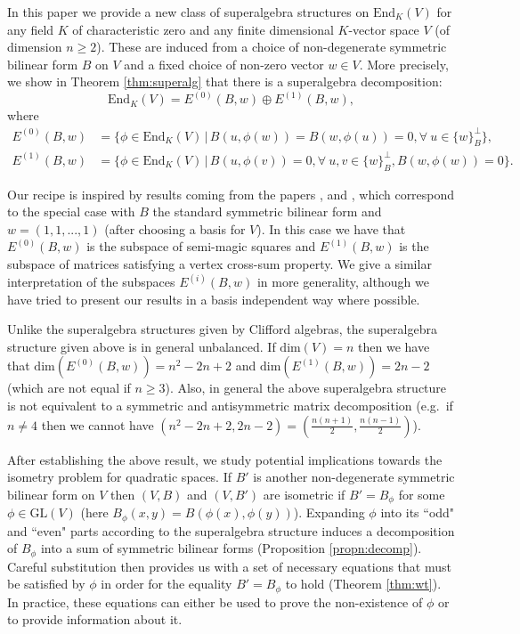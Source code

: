 \documentclass{amsart}
\theoremstyle{plain}
\theoremstyle{definition}
\begin{document}
In this paper we provide a new class of superalgebra structures on $\text{End}_K(V)$ for any field $K$ of characteristic zero and any finite dimensional $K$-vector space $V$ (of dimension $n\geq 2$). These are induced from a choice of non-degenerate symmetric bilinear form $B$ on $V$ and a fixed choice of non-zero vector $w\in V$. More precisely, we show in Theorem \ref{thm:superalg} that there is a superalgebra decomposition: \[\text{End}_K(V) = E^{(0)}(B,w)\oplus E^{(1)}(B,w),\] where \begin{align*}E^{(0)}(B,w) &= \{ \phi \in \text{End}_K(V) \,|\, B(u, \phi(w)) = B(w, \phi(u)) = 0, \forall \ u \in \{w\}_B^\perp\},\\ E^{(1)}(B,w) &= \{ \phi \in \text{End}_K(V) \,|\, B(u, \phi(v)) =0, \forall \ u,v \in \{w\}_B^\perp, B(w, \phi(w)) =0 \}.\end{align*}


Our recipe is inspired by results coming from the papers \cite{higham}, \cite{hill} and \cite{lettington}, which correspond to the special case with $B$ the standard symmetric bilinear form and $w = (1,1,...,1)$ (after choosing a basis for $V$). In this case we have that $E^{(0)}(B,w)$ is the subspace of semi-magic squares and $E^{(1)}(B,w)$ is the subspace of matrices satisfying a vertex cross-sum property. We give a similar interpretation of the subspaces $E^{(i)}(B,w)$ in more generality, although we have tried to present our results in a basis independent way where possible.

Unlike the superalgebra structures given by Clifford algebras, the superalgebra structure given above is in general unbalanced. If $\text{dim}(V) = n$ then we have that $\text{dim}(E^{(0)}(B,w)) = n^2-2n+2$ and $\text{dim}(E^{(1)}(B,w)) = 2n-2$ (which are not equal if $n\geq 3$). Also, in general the above superalgebra structure is not equivalent to a symmetric and antisymmetric matrix decomposition (e.g.\ if $n\neq 4$ then we cannot have $(n^2-2n+2, 2n-2) = \left(\frac{n(n+1)}{2},\frac{n(n-1)}{2}\right)$).

After establishing the above result, we study potential implications towards the isometry problem for quadratic spaces. If $B'$ is another non-degenerate symmetric bilinear form on $V$ then $(V,B)$ and $(V,B')$ are isometric if $B' = B_{\phi}$ for some $\phi\in\text{GL}(V)$ (here $B_{\phi}(x,y) = B(\phi(x),\phi(y))$). Expanding $\phi$ into its ``odd" and ``even" parts according to the superalgebra structure induces a decomposition of $B_{\phi}$ into a sum of symmetric bilinear forms (Proposition \ref{propn:decomp}). Careful substitution then provides us with a set of necessary equations that must be satisfied by $\phi$ in order for the equality $B' = B_{\phi}$ to hold (Theorem \ref{thm:wt}). In practice, these equations can either be used to prove the non-existence of $\phi$ or to provide information about it.
\end{document}
